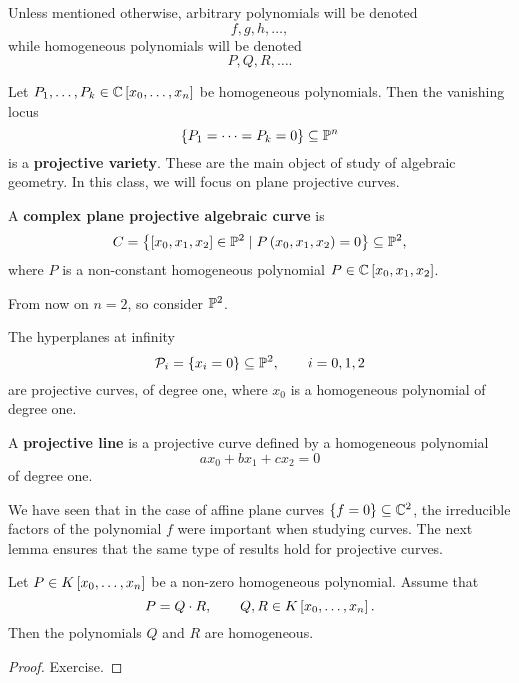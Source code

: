 \begin{notation}
Unless mentioned otherwise, arbitrary polynomials will be denoted
$$ f, g, h, \dots, $$
while homogeneous polynomials will be denoted
$$ P, Q, R, \dots. $$
\end{notation}

\pagebreak

Let $ P_1, \dots, P_k \in \C\sb{x_0, \dots, x_n} $ be homogeneous polynomials. Then the vanishing locus
$$ \cb{P_1 = \dots = P_k = 0} \subseteq \P^n $$
is a \textbf{projective variety}. These are the main object of study of algebraic geometry. In this class, we will focus on plane projective curves.

\begin{definition}
A \textbf{complex plane projective algebraic curve} is
$$ C = \cb{\sb{x_0, x_1, x_2} \in \P^2 \mid P\rb{x_0, x_1, x_2} = 0} \subseteq \P^2, $$
where $ P $ is a non-constant homogeneous polynomial $ P \in \C\sb{x_0, x_1, x_2} $.
\end{definition}

From now on $ n = 2 $, so consider $ \P^2 $.

\begin{example}
The hyperplanes at infinity
$$ \PP_i = \cb{x_i = 0} \subseteq \P^2, \qquad i = 0, 1, 2 $$
are projective curves, of degree one, where $ x_0 $ is a homogeneous polynomial of degree one.
\end{example}

\begin{definition}
A \textbf{projective line} is a projective curve defined by a homogeneous polynomial
$$ ax_0 + bx_1 + cx_2 = 0 $$
of degree one.
\end{definition}

We have seen that in the case of affine plane curves $ \cb{f = 0} \subseteq \C^2 $, the irreducible factors of the polynomial $ f $ were important when studying curves. The next lemma ensures that the same type of results hold for projective curves.

\begin{lemma}
\label{lem:4.10}
Let $ P \in K\sb{x_0, \dots, x_n} $ be a non-zero homogeneous polynomial. Assume that
$$ P = Q \cdot R, \qquad Q, R \in K\sb{x_0, \dots, x_n}. $$
Then the polynomials $ Q $ and $ R $ are homogeneous.
\end{lemma}

\begin{proof}
Exercise.
\end{proof}

